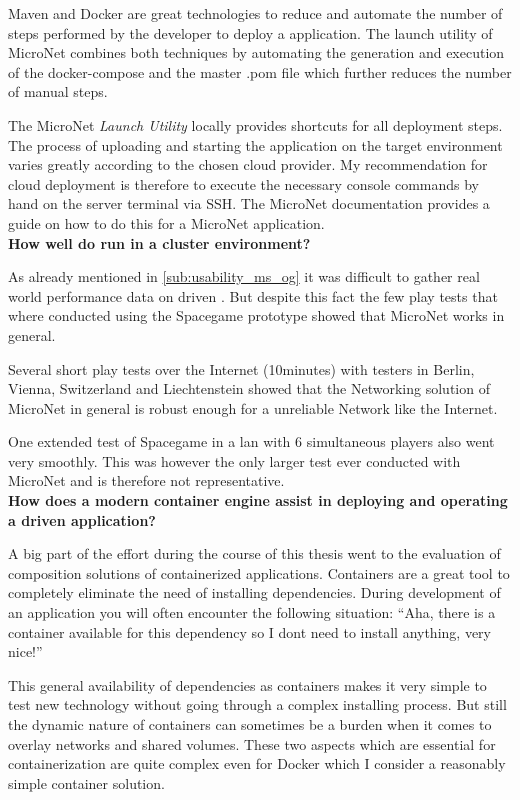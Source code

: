 Maven and Docker are great technologies to reduce and automate the number of
steps performed by the developer to deploy a \ms{} application. The launch
utility of MicroNet combines both techniques by automating the generation and
execution of the docker-compose and the master .pom file which further reduces
the number of manual steps.

The MicroNet \textit{Launch Utility} locally provides shortcuts for all
deployment steps. The process of uploading and starting the application on the
target environment varies greatly according to the chosen cloud provider. My
recommendation for cloud deployment is therefore to execute the necessary
console commands by hand on the server terminal via SSH. The MicroNet
documentation provides a guide on how to do this \cite{micronet2017doku} for a
MicroNet application.\\

\noindent
\textbf{How well do \ogs{} run in a cluster environment?}

As already mentioned in \autoref{sub:usability_ms_og} it was difficult to
gather real world performance data on \ms{} driven \ogs{}. But despite this fact
the few play tests that where conducted using the Spacegame prototype showed that
MicroNet works in general.

Several short play tests over the Internet (10minutes) with testers in Berlin,
Vienna, Switzerland and Liechtenstein showed that the Networking solution of
MicroNet in general is robust enough for a unreliable Network like the Internet.

One extended test of Spacegame in a \gls{lan} with 6 simultaneous players also
went very smoothly. This was however the only larger test ever conducted with
MicroNet and is therefore not representative.\\

\noindent
\textbf{How does a modern container engine assist in deploying and operating a
\ms{} driven application?}

A big part of the effort during the course of this thesis went to the evaluation
of composition solutions of containerized applications. Containers are a great
tool to completely eliminate the need of installing dependencies. During
development of an application you will often encounter the following situation:
``Aha, there is a container available for this dependency so I dont need to
install anything, very nice!''

This general availability of dependencies as containers makes it very simple to
test new technology without going through a complex installing process. But
still the dynamic nature of containers can sometimes be a burden when it comes
to overlay networks and shared volumes. These two aspects which are essential
for containerization are quite complex even for Docker which I consider a
reasonably simple container solution.

